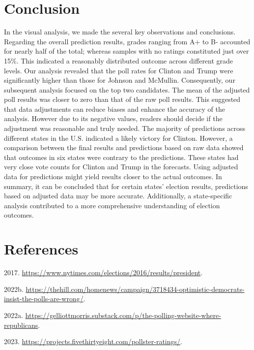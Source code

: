 \documentclass[
  11pt,
]{article}
\newlength{\cslhangindent}
\newlength{\cslentryspacingunit} %
\newenvironment{CSLReferences}[2] %
 {%
  \setlength{\parindent}{0pt}
  \ifodd #1
  \let\oldpar\par
  \def\par{\hangindent=\cslhangindent\oldpar}
  \fi
  \setlength{\parskip}{#2\cslentryspacingunit}
 }%
 {}
\begin{document}
\hypertarget{conclusion}{%
\section{Conclusion}\label{conclusion}}

In the visual analysis, we made the several key observations and
conclusions. Regarding the overall prediction results, grades ranging
from A+ to B- accounted for nearly half of the total; whereas samples
with no ratings constituted just over 15\%. This indicated a reasonably
distributed outcome across different grade levels. Our analysis revealed
that the poll rates for Clinton and Trump were significantly higher than
those for Johnson and McMullin. Consequently, our subsequent analysis
focused on the top two candidates. The mean of the adjusted poll results
was closer to zero than that of the raw poll results. This suggested
that data adjustments can reduce biases and enhance the accuracy of the
analysis. However due to its negative values, readers should decide if
the adjustment was reasonable and truly needed. The majority of
predictions across different states in the U.S. indicated a likely
victory for Clinton. However, a comparison between the final results and
predictions based on raw data showed that outcomes in six states were
contrary to the predictions. These states had very close vote counts for
Clinton and Trump in the forecasts. Using adjusted data for predictions
might yield results closer to the actual outcomes. In summary, it can be
concluded that for certain states' election results, predictions based
on adjusted data may be more accurate. Additionally, a state-specific
analysis contributed to a more comprehensive understanding of election
outcomes.

\hypertarget{references}{%
\section*{References}\label{references}}

\hypertarget{refs}{}
\begin{CSLReferences}{1}{0}
\leavevmode{}%
2017. \url{https://www.nytimes.com/elections/2016/results/president}.

\leavevmode{}%
2022b.
\url{https://thehill.com/homenews/campaign/3718434-optimistic-democrats-insist-the-polls-are-wrong/}.

\leavevmode{}%
2022a.
\url{https://gelliottmorris.substack.com/p/the-polling-website-where-republicans}.

\leavevmode{}%
2023. \url{https://projects.fivethirtyeight.com/pollster-ratings/}.

\end{CSLReferences}
\end{document}
